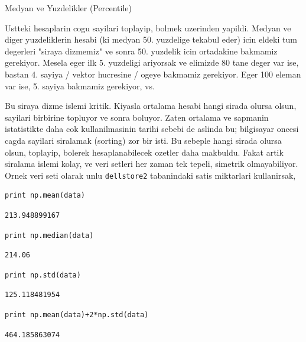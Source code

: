 \documentclass[12pt,fleqn]{article}\usepackage{../common}
\begin{document}
Medyan ve Yuzdelikler (Percentile)

Ustteki hesaplarin cogu sayilari toplayip, bolmek uzerinden yapildi. Medyan
ve diger yuzdeliklerin hesabi (ki medyan 50. yuzdelige tekabul eder) icin
eldeki tum degerleri "siraya dizmemiz" ve sonra 50. yuzdelik icin
ortadakine bakmamiz gerekiyor. Mesela eger ilk 5. yuzdeligi ariyorsak ve
elimizde 80 tane deger var ise, bastan 4. sayiya / vektor hucresine / ogeye
bakmamiz gerekiyor. Eger 100 eleman var ise, 5. sayiya bakmamiz gerekiyor,
vs.

Bu siraya dizme islemi kritik. Kiyasla ortalama hesabi hangi sirada olursa
olsun, sayilari birbirine topluyor ve sonra boluyor. Zaten ortalama ve
sapmanin istatistikte daha cok kullanilmasinin tarihi sebebi de aslinda bu;
bilgisayar oncesi cagda sayilari siralamak (sorting) zor bir isti. Bu
sebeple hangi sirada olursa olsun, toplayip, bolerek hesaplanabilecek
ozetler daha makbuldu. Fakat artik siralama islemi kolay, ve veri setleri
her zaman tek tepeli, simetrik olmayabiliyor. Ornek veri seti olarak unlu
\verb!dellstore2! tabanindaki satis miktarlari kullanirsak,

\begin{verbatim}
print np.mean(data)
\end{verbatim}

\begin{verbatim}
213.948899167
\end{verbatim}

\begin{verbatim}
print np.median(data)
\end{verbatim}

\begin{verbatim}
214.06
\end{verbatim}

\begin{verbatim}
print np.std(data)
\end{verbatim}

\begin{verbatim}
125.118481954
\end{verbatim}

\begin{verbatim}
print np.mean(data)+2*np.std(data)
\end{verbatim}

\begin{verbatim}
464.185863074
\end{verbatim}
\end{document}
